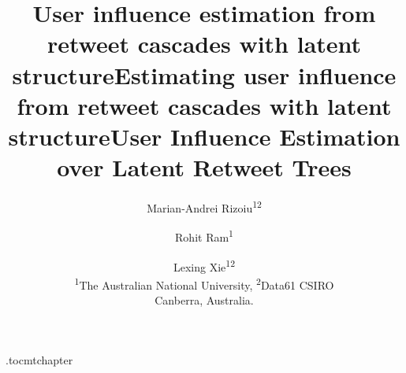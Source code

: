 \documentclass[letterpaper]{article} %
\begin{document}
\etocdepthtag.toc{mtchapter}
%
\title{User influence estimation from retweet cascades with latent structure}
\title{Estimating user influence from retweet cascades with latent structure}
\title{User Influence Estimation over Latent Retweet Trees}
\author{
	Marian-Andrei Rizoiu\textsuperscript{1}\textsuperscript{2} 
	\and Rohit Ram\textsuperscript{1}
	\and Lexing Xie\textsuperscript{1}\textsuperscript{2}\\ 
	\textsuperscript{1}The Australian National University,
	\textsuperscript{2}Data61 CSIRO\\
	Canberra, Australia.\\
}

\maketitle

\begin{abstract}
	
\end{abstract}




%
%
%
%
%
%
%
%
%
%
%

{ %
	\fontsize{9.0pt}{10.0pt}
	\selectfont
	
	
}

%
\end{document}
